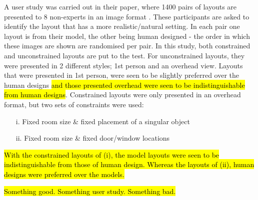 A user study was carried out in their paper, where 1400 pairs of layouts are presented to 8 non-experts in an image format \cite{constrained-layouts}. These participants are asked to identify the layout that has a more realistic/natural setting. In each pair one layout is from their model, the other being human designed - the order in which these images are shown are randomised per pair.
In this study, both constrained and unconstrained layouts are put to the test. For unconstrained layouts, they were presented in 2 different styles; 1st person and an overhead view. Layouts that were presented in 1st person, were seen to be slightly preferred over the human designs \hl{and those presented overhead were seen to be indistinguishable from human designs}.
Constrained layouts were only presented in an overhead format, but two sets of constraints were used:
\begin{enumerate}
    \item[i.] Fixed room size \& fixed placement of a singular object
    \item[ii.] Fixed room size \& fixed door/window locations
\end{enumerate}
\hl{With the constrained layouts of (i), the model layouts were seen to be indistinguishable from those of human design. Whereas the layouts of (ii), human designs were preferred over the models.}

\hl{Something good. Something user study. Something bad.}

